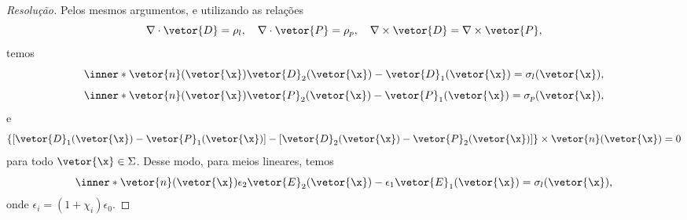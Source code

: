 \begin{proof}[Resolução]
    Pelos mesmos argumentos, e utilizando as relações
    \begin{equation*}
        \nabla \cdot \vetor{D} = \rho_l, \quad
        \nabla \cdot \vetor{P} = \rho_p,\quad
        \nabla\times \vetor{D} = \nabla\times \vetor{P},
    \end{equation*}
    temos
    \begin{equation*}
        \inner*{\vetor{n}(\vetor{\x})}{\vetor{D}_2(\vetor{\x}) - \vetor{D}_1(\vetor{\x})} = \sigma_l(\vetor{\x}),
    \end{equation*}
    \begin{equation*}
        \inner*{\vetor{n}(\vetor{\x})}{\vetor{P}_2(\vetor{\x}) - \vetor{P}_1(\vetor{\x})} = \sigma_p(\vetor{\x}),
    \end{equation*}
    e
    \begin{equation*}
        \left\{\left[\vetor{D}_1(\vetor{\x}) - \vetor{P}_1(\vetor{\x})\right] - \left[\vetor{D}_2(\vetor{\x}) - \vetor{P}_2(\vetor{\x})\right]\right\}\times \vetor{n}(\vetor{\x}) = 0
    \end{equation*}
    para todo \(\vetor{\x} \in \Sigma\). Desse modo, para meios lineares, temos
    \begin{equation*}
        \inner*{\vetor{n}(\vetor{\x})}{\epsilon_2\vetor{E}_2(\vetor{\x}) - \epsilon_1\vetor{E}_1(\vetor{\x})} = \sigma_l(\vetor{\x}),
    \end{equation*}
    onde \(\epsilon_i = (1 + \chi_i)\epsilon_0\).
\end{proof}
